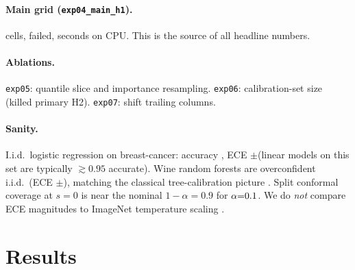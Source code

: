 \documentclass[10pt,twocolumn]{article}
\begin{document}
\paragraph{Main grid (\texttt{exp04\_main\_h1}).}
\NumExpFourN{} cells, \NumExpFourFailed{} failed, \NumExpFourSeconds{}
seconds on CPU. This is the source of all headline numbers.

\paragraph{Ablations.}
\texttt{exp05}: quantile slice and importance resampling.
\texttt{exp06}: calibration-set size (killed primary H2).
\texttt{exp07}: shift trailing columns.

\paragraph{Sanity.}
I.i.d.\ logistic regression on breast-cancer: accuracy \NumBcLogregAcc,
ECE \NumBcLogregEce$\pm$\NumBcLogregEceStd (linear models on this set
are typically $\gtrsim 0.95$ accurate). Wine random forests are
overconfident i.i.d.\ (ECE \NumWineRfEceIid$\pm$\NumWineRfEceIidStd),
matching the classical tree-calibration picture
\cite{niculescumizil2005probabilities}. Split conformal coverage at
$s{=}0$ is near the nominal $1-\alpha=0.9$ for $\alpha{=}0.1$. We do \emph{not} compare
ECE magnitudes to ImageNet temperature scaling \cite{guo2017calibration}.

\section{Results}
\end{document}

